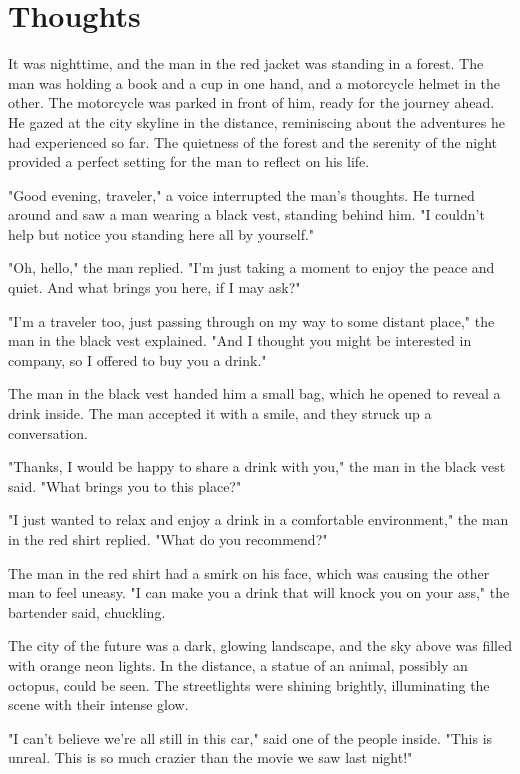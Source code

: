 \documentclass[smalldemyvopaper,11pt,twoside,onecolumn,openright,extrafontsizes]{memoir}
\begin{document}
\chapter{Thoughts}
It was nighttime, and the man in the red jacket was standing in a forest. The man was holding a book and a cup in one hand, and a motorcycle helmet in the other. The motorcycle was parked in front of him, ready for the journey ahead. He gazed at the city skyline in the distance, reminiscing about the adventures he had experienced so far. The quietness of the forest and the serenity of the night provided a perfect setting for the man to reflect on his life.\par
"Good evening, traveler," a voice interrupted the man's thoughts. He turned around and saw a man wearing a black vest, standing behind him. "I couldn't help but notice you standing here all by yourself."\par
"Oh, hello," the man replied. "I'm just taking a moment to enjoy the peace and quiet. And what brings you here, if I may ask?"\par
"I'm a traveler too, just passing through on my way to some distant place," the man in the black vest explained. "And I thought you might be interested in company, so I offered to buy you a drink."\par
The man in the black vest handed him a small bag, which he opened to reveal a drink inside. The man accepted it with a smile, and they struck up a conversation.\par
"Thanks, I would be happy to share a drink with you," the man in the black vest said. "What brings you to this place?"\par
"I just wanted to relax and enjoy a drink in a comfortable environment," the man in the red shirt replied. "What do you recommend?"\par
The man in the red shirt had a smirk on his face, which was causing the other man to feel uneasy. "I can make you a drink that will knock you on your ass," the bartender said, chuckling.\par
The city of the future was a dark, glowing landscape, and the sky above was filled with orange neon lights. In the distance, a statue of an animal, possibly an octopus, could be seen. The streetlights were shining brightly, illuminating the scene with their intense glow.\par
"I can't believe we're all still in this car," said one of the people inside. "This is unreal. This is so much crazier than the movie we saw last night!"\par
\end{document}
